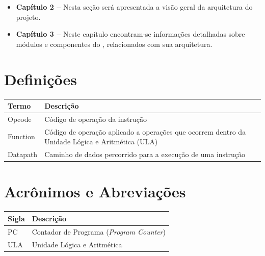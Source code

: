 \documentclass{report}
\begin{document}
  \begin{itemize}
  	\item \textbf{Capítulo 2 --} Nesta seção será apresentada a visão geral da arquitetura do projeto.
  	\item \textbf{Capítulo 3 --} Neste capítulo encontram-se informações detalhadas sobre módulos e componentes do \ipPROCESSProject, relacionados com sua arquitetura.
  \end{itemize}


  \section{Definições}
    \FloatBarrier
    \begin{table}[H]
      \begin{center}
        \begin{tabular}[pos]{|m{5cm} | m{9cm}|} 
          \hline
          \cellcolor[gray]{0.9}\textbf{Termo} & \cellcolor[gray]{0.9}\textbf{Descrição} \\ \hline
           Opcode   & Código de operação da instrução \\ \hline
           Function & Código de operação aplicado a operações que ocorrem dentro da Unidade Lógica e Aritmética (ULA)  \\ \hline
           Datapath & Caminho de dados percorrido para a execução de uma instrução \\ \hline
        \end{tabular}
      \end{center}
    \end{table}  

  \section{Acrônimos e Abreviações}
    \FloatBarrier
    \begin{table}[H]
      \begin{center}
        \begin{tabular}[pos]{|m{2cm} | m{12cm}|} 
          \hline
          \cellcolor[gray]{0.9}\textbf{Sigla} & \cellcolor[gray]{0.9}\textbf{Descrição} \\ \hline
             PC       &  Contador de Programa (\textit{Program Counter})\\ \hline
             ULA      &  Unidade Lógica e Aritmética\\ \hline
        \end{tabular}
      \end{center}
    \end{table}  
\end{document}
